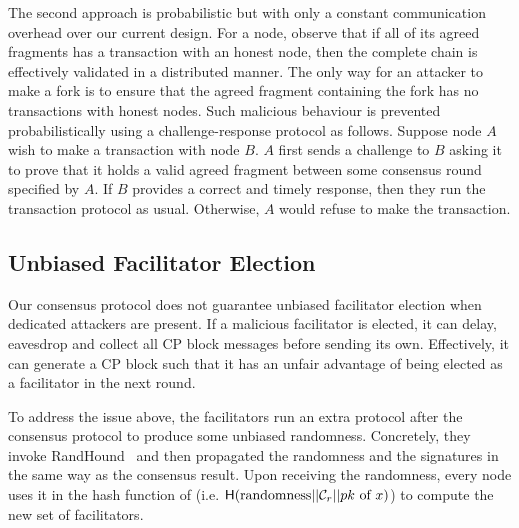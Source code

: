 The second approach is probabilistic but with only a constant communication overhead over our current design.
For a node, observe that if all of its agreed fragments has a transaction with an honest node,
then the complete chain is effectively validated in a distributed manner.
The only way for an attacker to make a fork is to ensure that the agreed fragment containing the fork has no transactions with honest nodes.
Such malicious behaviour is prevented probabilistically using a challenge-response protocol as follows.
Suppose node $A$ wish to make a transaction with node $B$.
$A$ first sends a challenge to $B$ asking it to prove that it holds a valid agreed fragment between some consensus round specified by $A$.
If $B$ provides a correct and timely response, then they run the transaction protocol as usual.
Otherwise, $A$ would refuse to make the transaction.

\subsection{Unbiased Facilitator Election}
Our consensus protocol does not guarantee unbiased facilitator election when dedicated attackers are present.
If a malicious facilitator is elected, it can delay, eavesdrop and collect all CP block messages before sending its own.
Effectively, it can generate a CP block such that it has an unfair advantage of being elected as a facilitator in the next round.

To address the issue above,
the facilitators run an extra protocol after the consensus protocol to produce some unbiased randomness.
Concretely, they invoke RandHound~\cite{syta2017scalable} and then propagated the randomness and the signatures in the same way as the consensus result.
Upon receiving the randomness,
every node uses it in the hash function of  (i.e. $\textsf{H}(\text{randomness} || \mathcal{C}_r || pk \text{ of } x)$) to compute the new set of facilitators.

